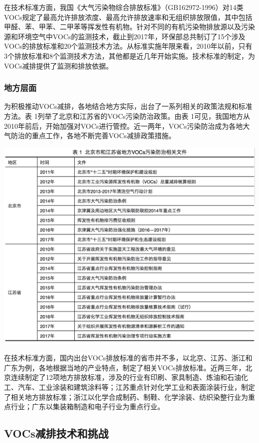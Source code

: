 \documentclass[
]{book}
\begin{document}
在技术标准方面，我国《大气污染物综合排放标准》（GB162972-1996）对14类VOCs规定了最高允许排放浓度、最高允许排放速率和无组织排放限值，其中包括甲醛、苯、甲苯、二甲苯等挥发性有机物。针对不同的有机污染物排放源以及污染源和环境空气中VOCs的监测技术，截止到2017年，环保部总共制订了15个涉及VOCs的排放标准和20个监测技术方法。从标准实施年限来看，2010年以前，只有3个排放标准和8个监测技术方法，其他都是近几年开始实施。技术标准的制定，为VOCs减排提供了监测和排放依据。

\hypertarget{ux5730ux65b9ux5c42ux9762}{%
\subsubsection{地方层面}\label{ux5730ux65b9ux5c42ux9762}}

为积极推动VOCs减排，各地结合地方实际，出台了一系列相关的政策法规和标准方法。表 1列举了北京和江苏省的VOCs污染防治政策。由表 1可见，我国地方从2010年前后，开始加强对VOCs进行管控。近一两年，VOCs污染防治成为各地大气防治的重点工作，各地不断完善VOCs减排政策措施。

\includegraphics[width=8.33in]{images/voc7}

在技术标准方面，国内出台VOCs排放标准的省市并不多，以北京、江苏、浙江和广东为例，各地根据当地的产业特点，制定了相关VOCs排放标准。近两三年，北京连续制定了12项地方排放标准，涉及的行业有印刷、家具制造、炼油和石油化工、汽车、工业涂装和建筑涂料等；江苏重点针对化学工业和表面涂装行业，制定了相关地方排放标准；浙江以化学合成制药、制鞋、化学涂装、纺织染整行业为重点行业；广东以集装箱制造和电子行业为重点行业。

\hypertarget{vocsux51cfux6392ux6280ux672fux548cux6311ux6218}{%
\subsection{VOCs减排技术和挑战}\label{vocsux51cfux6392ux6280ux672fux548cux6311ux6218}}
\end{document}
